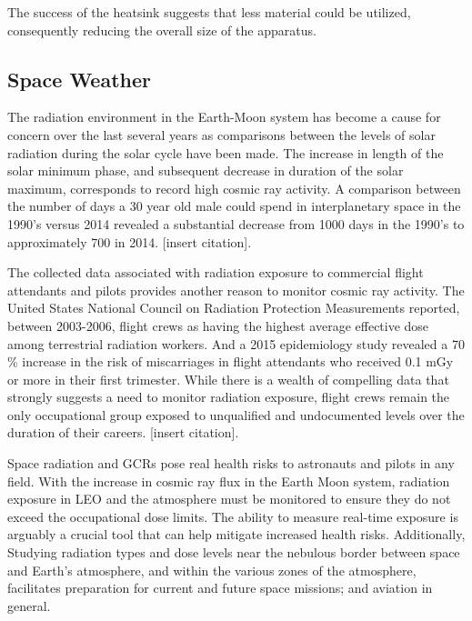 The success of the heatsink suggests that less material could be utilized, consequently reducing the overall size of the apparatus.



\subsection{Space Weather}





The radiation environment in the Earth-Moon system has become a cause for concern over the last several years as comparisons between the levels of solar radiation during the solar cycle have been made. The increase in length of the solar minimum phase, and subsequent decrease in duration of the solar maximum, corresponds to record high cosmic ray activity.  A comparison between the number of days a 30 year old male could spend in interplanetary space in the 1990's versus 2014 revealed a substantial decrease from 1000 days in the 1990's to approximately 700 in 2014. [insert citation].

The collected data associated with radiation exposure to commercial flight attendants and pilots provides another reason to monitor cosmic ray activity.  The United States National Council on Radiation Protection Measurements reported, between 2003-2006, flight crews as having the highest average effective dose among terrestrial radiation workers.  And a 2015 epidemiology study revealed a 70 \% increase in the risk of miscarriages in flight attendants who received 0.1 mGy or more in their first trimester.  While there is a wealth of compelling data that strongly suggests a need to monitor radiation exposure, flight crews remain the only occupational group exposed to unqualified and undocumented levels over the duration of their careers. [insert citation].     

Space radiation and GCRs pose real health risks to astronauts and  pilots in any field.  With the increase in cosmic ray flux in the Earth Moon system, radiation exposure in LEO and the atmosphere must be monitored to ensure they do not exceed the occupational dose limits.  The ability to measure real-time exposure is arguably a crucial tool that can help mitigate increased health risks.  Additionally, Studying radiation types and dose levels near the nebulous border between space and Earth's atmosphere, and within the various zones of the atmosphere, facilitates preparation for current and future space missions; and aviation in general. 

